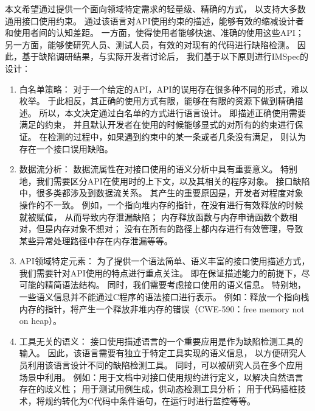 本文希望通过提供一个面向领域特定需求的轻量级、精确的方式，
以支持大多数通用接口使用约束。
通过该语言对API使用约束的描述，能够有效的缩减设计者和使用者间的认知差距。
一方面，使得使用者能够快速、准确的使用这些API；
另一方面，能够使研究人员、测试人员，有效的对现有的代码进行缺陷检测。
因此，基于缺陷调研结果，与实际开发者讨论后，
我们基于以下原则进行IMSpec的设计：
\begin{enumerate}
	\item 白名单策略：
	对于一个给定的API，API的误用存在很多种不同的形式，难以枚举。
	于此相反，其正确的使用方式有限，能够在有限的资源下做到精确描述。
	所以，本文决定通过白名单的方式进行语言设计。
	即描述正确使用需要满足的约束，
	并且默认开发者在使用的时候能够显式的对所有的约束进行保证。
	在检测的过程中，如果遇到约束中的某一条或者几条没有满足，
	则认为存在一个接口误用缺陷。
	
	\item 数据流分析：
	数据流属性在对接口使用的语义分析中具有重要意义。
	特别地，我们需要区分API在使用时的上下文，以及其相关的程序对象。
	接口缺陷中，很多类都涉及到数据流关系。
	其产生的重要原因是，开发者对程度对象操作的不一致。
	例如，一个指向堆内存的指针，在没有进行有效释放的时候就被赋值，
	从而导致内存泄漏缺陷；
	内存释放函数与内存申请函数个数相对，但是内存对象不想对；
	没有在所有的路径上都内存进行有效管理，导致某些异常处理路径中存在内存泄漏等等。
	
	\item API领域特定元素：
	为了提供一个语法简单、语义丰富的接口使用描述方式，
	我们需要针对API使用的特点进行重点关注。
	即在保证描述能力的前提下，尽可能的精简语法结构。
	同时，我们需要考虑接口使用的语义信息。
	特别地，一些语义信息并不能通过C程序的语法接口进行表示。
	例如：释放一个指向栈内存的指针，将产生一个释放非堆内存的错误（CWE-590：free memory not on heap）。
	
	\item 工具无关的语义：
	接口使用描述语言的一个重要应用是作为缺陷检测工具的输入。
	因此，该语言需要有独立于特定工具实现的语义信息，
	以方便研究人员利用该语言设计不同的缺陷检测工具。
	同时，可以被研究人员在多个应用场景中利用。
	例如：用于文档中对接口使用规约进行定义，以解决自然语言存在的歧义性；
	用于测试用例生成，供动态检测工具分析；
	用于代码插桩技术，将规约转化为C代码中条件语句，在运行时进行监控等等。
\end{enumerate}

